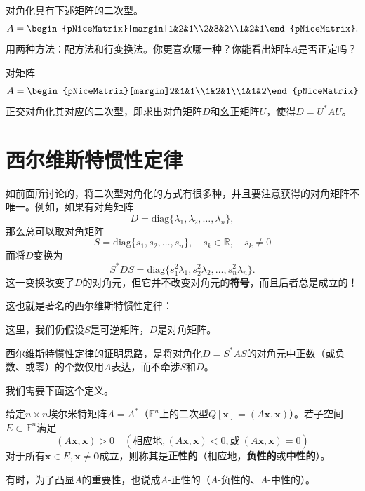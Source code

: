\begin{problemset}
    \item 对角化具有下述矩阵的二次型。
    \[A=\begin{pNiceMatrix}[margin]1&2&1\\2&3&2\\1&2&1\end{pNiceMatrix}.\]
    用两种方法：配方法和行变换法。你更喜欢哪一种？你能看出矩阵$A$是否正定吗？
    \item 对矩阵\[A=\begin{pNiceMatrix}[margin]2&1&1\\1&2&1\\1&1&2\end{pNiceMatrix}\]
    正交对角化其对应的二次型，即求出对角矩阵$D$和幺正矩阵$U$，使得$D=U^*AU$。
\end{problemset}

\section{西尔维斯特惯性定律}

如前面所讨论的，将二次型对角化的方式有很多种，并且要注意获得的对角矩阵不唯一。例如，如果有对角矩阵
\[D=\mathrm{diag}\{\lambda_1,\lambda_2,\ldots,\lambda_n\},\]
那么总可以取对角矩阵
\[S=\mathrm{diag}\{s_1,s_2,\ldots,s_n\},\quad s_k\in\mathbb{R},\quad s_k\neq0\]
而将$D$变换为\[S^*DS=\mathrm{diag}\{s_1^2\lambda_1,s_2^2\lambda_2,\ldots,s_n^2\lambda_n\}.\]
这一变换改变了$D$的对角元，但它并不改变对角元的{\bf 符号}，而且后者总是成立的！

这也就是著名的西尔维斯特惯性定律：
\begin{center}
\end{center}
这里，我们仍假设$S$是可逆矩阵，$D$是对角矩阵。

西尔维斯特惯性定律的证明思路，是将对角化$D=S^*AS$的对角元中正数（或负数、或零）的个数仅用$A$表达，而不牵涉$S$和$D$。

我们需要下面这个定义。

\begin{definition*}
    给定$n\times n$埃尔米特矩阵$A=A^*$（$\mathbb{F}^n$上的二次型$Q[\mathbf{x}]=(A\mathbf{x},\mathbf{x})$）。若子空间$E\subset \mathbb{F}^n$满足
    \[(A\mathbf{x},\mathbf{x})>0\quad(\text{相应地},(A\mathbf{x},\mathbf{x})<0,\text{或}~(A\mathbf{x},\mathbf{x})=0)\]
    对于所有$\mathbf{x}\in E,\mathbf{x}\ne \mathbf{0}$成立，则称其是{\bf 正性的}（相应地，{\bf 负性的}或{\bf 中性的}）。

    有时，为了凸显$A$的重要性，也说成$A$-正性的（$A$-负性的、$A$-中性的）。
\end{definition*}

